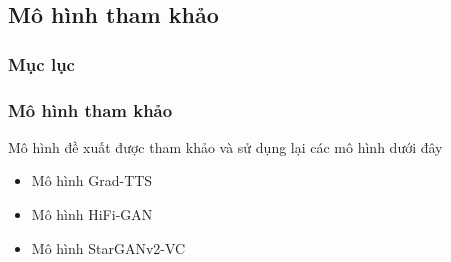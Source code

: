 \documentclass{beamer}
\numberwithin{figure}{section}
\numberwithin{table}{section}
\begin{document}
\subsection{Mô hình tham khảo}
{
    \begin{frame}
        \frametitle{Mục lục}
    \end{frame}
}
\begin{frame}
\frametitle{Mô hình tham khảo}
Mô hình đề xuất được tham khảo và sử dụng lại các mô hình dưới đây
\begin{itemize}
    \item Mô hình Grad-TTS 
    \item Mô hình HiFi-GAN 
    \item Mô hình StarGANv2-VC 
\end{itemize}
\end{frame}



\end{document}
